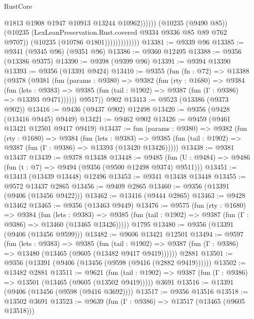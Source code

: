 \begin{lexlean}{RustCore}
\begin{coremodule}
                                      @1813
                                      @1908
                                      @1947
                                      @10913
                                      @13244
                                      @10962))))))
                          (@10235 (@9490 @85))
                          (@10235 (LexLeanPreservation.Rust.covered @9334 @9336 @85 @89 @762 @9707))
                          (@10235 (@10786 @1801)))))))))))))
@13381 := @9339 @96
@13385 := @9341 (@9345 @96) (@9351 @96)
@13386 := @9360 @12495
@13388 := @9356 (@13386 @9375)
@13390 := @9398 (@9399 @96)
@13391 := @9394 @13390
@13393 := @9356 (@13391 @9424)
@13410 := @9355
    (fun (fn : @72) =>
    @13388
      (@9378
        (@9381
          (fun (params : @9380) =>
          @9382
            (fun (rty : @1680) =>
            @9384
              (fun (lets : @9383) =>
              @9385 (fun (tail : @1902) => @9387 (fun (Γ : @9386) => @13393 @9471))))))
        @9517))
    @902
@13413 := @9523 (@13386 (@9373 @902))
@13416 := @9436 (@9437 @902) @12498
@13420 := @9356 (@9428 (@13416 @9445) @9449)
@13421 := @9462 @902
@13426 := @9459 (@9461 @13421 @12501 @9417 @9419)
@13437 := fun (params : @9380) =>
  @9382
    (fun (rty : @1680) =>
    @9384
      (fun (lets : @9383) =>
      @9385 (fun (tail : @1902) => @9387 (fun (Γ : @9386) => @13393 (@13420 @13426)))))
@13438 := @9381 @13437
@13439 := @9378 @13438
@13448 := @9485
    (fun (U : @9484) => @9486 (fun (t : @7) => @9494 (@9356 (@9500 @12498 @9374) @9511)))
@13451 := @13413 (@13439 @13448) @12496
@13453 := @9341 @13438 @13448
@13455 := @9572 @13437 @2865
@13456 := @9409 @2865
@13460 := @9356 (@13391 (@9406 (@13456 @9422)))
@13462 := @13416 (@9444 @2865)
@13463 := @9428 @13462
@13465 := @9356 (@13463 @9449)
@13476 := @9575
    (fun (rty : @1680) =>
    @9384
      (fun (lets : @9383) =>
      @9385 (fun (tail : @1902) => @9387 (fun (Γ : @9386) => @13460 (@13465 @13426)))))
    @1795
@13480 := @9356 (@13391 (@9406 (@13456 @9599)))
@13482 := @9606 @13421 @12501
@13494 := @9597
    (fun (lets : @9383) =>
    @9385
      (fun (tail : @1902) =>
      @9387 (fun (Γ : @9386) => @13480 (@13465 (@9605 (@13482 @9417 @9419))))))
    @2881
@13501 := @9356 (@13391 (@9406 (@13456 (@9598 (@9416 (@2882 @9419))))))
@13502 := @13482 @2881
@13511 := @9621
    (fun (tail : @1902) => @9387 (fun (Γ : @9386) => @13501 (@13465 (@9605 (@13502 @9419)))))
    @3691
@13516 := @13391 (@9406 (@13456 (@9598 (@9416 @3692))))
@13517 := @9356 @13516
@13518 := @13502 @3691
@13523 := @9639 (fun (Γ : @9386) => @13517 (@13465 (@9605 @13518)))

\end{coremodule}
\end{lexlean}

